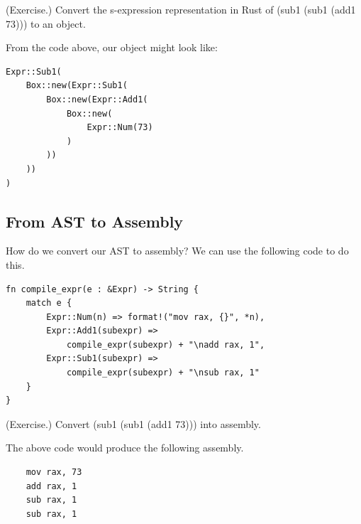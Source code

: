 \begin{mdframed}
    (Exercise.) Convert the s-expression representation in Rust of \code(sub1 (sub1 (add1 73))) to an  object. 

    \begin{mdframed}
        From the code above, our object might look like: 
        \begin{verbatim}
Expr::Sub1(
    Box::new(Expr::Sub1(
        Box::new(Expr::Add1(
            Box::new(
                Expr::Num(73)
            )
        ))
    ))
)\end{verbatim}
    \end{mdframed}
\end{mdframed}


\subsection{From AST to Assembly}
How do we convert our AST to assembly? We can use the following code to do this. 
\begin{verbatim}
fn compile_expr(e : &Expr) -> String {
    match e {
    	Expr::Num(n) => format!("mov rax, {}", *n),
    	Expr::Add1(subexpr) =>
            compile_expr(subexpr) + "\nadd rax, 1",
    	Expr::Sub1(subexpr) =>
            compile_expr(subexpr) + "\nsub rax, 1"
    }
}
\end{verbatim}

\begin{mdframed}
    (Exercise.) Convert \code(sub1 (sub1 (add1 73))) into assembly. 

    \begin{mdframed}
        The above code would produce the following assembly. 
        \begin{verbatim}
    mov rax, 73
    add rax, 1 
    sub rax, 1
    sub rax, 1\end{verbatim}
    \end{mdframed}
\end{mdframed}